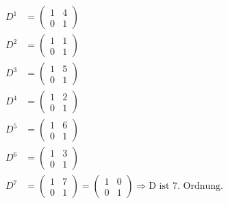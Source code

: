 \documentclass[a4paper]{scrartcl}
\begin{document}
		\begin{align}
			D^1&=\begin{pmatrix}
				1&4\\ 0&1
			\end{pmatrix} \\
			D^2&=\begin{pmatrix}
				1&1\\ 0&1
			\end{pmatrix} \\
			D^3&=\begin{pmatrix}
				1&5\\ 0&1
			\end{pmatrix} \\
			D^4&=\begin{pmatrix}
				1&2\\ 0&1
			\end{pmatrix} \\
			D^5&=\begin{pmatrix}
				1&6\\ 0&1
			\end{pmatrix} \\
			D^6&=\begin{pmatrix}
				1&3\\ 0&1
			\end{pmatrix} \\
			D^7&=\begin{pmatrix}
				1&7\\ 0&1
			\end{pmatrix} =\begin{pmatrix}
				1&0 \\ 0&1
			\end{pmatrix} \Rightarrow \text{D ist 7. Ordnung.} 
		\end{align}
	\newpage
\end{document}
